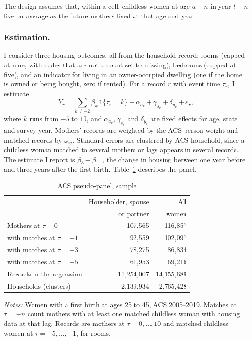 The design assumes that, within a cell, childless women at age $a-n$ in year
$t-n$ live on average as the future mothers lived at that age and year
\citep[Assumption 3]{klevenGeographyChildPenalties2025}.

\subsubsection*{Estimation.}
I consider three housing outcomes, all from the household record: rooms
(capped at nine, with codes that are not a count set to missing), bedrooms
(capped at five), and an indicator for living in an owner-occupied dwelling
(one if the home is owned or being bought, zero if rented). For a record $r$
with event time $\tau_r$, I estimate
\begin{equation}
Y_r = \sum_{k \neq -2} \beta_k \, \mathbf{1}\{\tau_r = k\} + \alpha_{a_r} +
\gamma_{s_r} + \delta_{y_r} + \varepsilon_r ,
\end{equation}
where $k$ runs from $-5$ to $10$, and $\alpha_{a_r}$, $\gamma_{s_r}$ and
$\delta_{y_r}$ are fixed effects for age, state and survey year. Mothers'
records are weighted by the ACS person weight and matched records by
$\omega_{ij}$. Standard errors are clustered by ACS household, since a childless woman
matched to several mothers or lags appears in several records. The estimate I
report is $\beta_3 - \beta_{-1}$, the change in housing between one year
before and three years after the first birth. Table~\ref{tab:app-acs-sample} describes the panel.

\begin{table}[ht]
\centering
\caption{ACS pseudo-panel, sample}
\label{tab:app-acs-sample}
\small
\begin{tabular}{@{}lrr@{}}
\toprule
 & Householder, spouse & All \\
 & or partner & women \\
\midrule
Mothers at $\tau = 0$ & 107{,}565 & 116{,}857 \\
\quad with matches at $\tau = -1$ & 92{,}559 & 102{,}097 \\
\quad with matches at $\tau = -3$ & 78{,}275 & 86{,}834 \\
\quad with matches at $\tau = -5$ & 61{,}953 & 69{,}216 \\
Records in the regression & 11{,}254{,}007 & 14{,}155{,}689 \\
Households (clusters) & 2{,}139{,}934 & 2{,}765{,}428 \\
\bottomrule
\end{tabular}
\par\smallskip
\begin{minipage}{0.75\linewidth}
\footnotesize\textit{Notes:} Women with a first birth at ages 25 to 45, ACS
2005--2019. Matches at $\tau=-n$ count mothers with at least one matched
childless woman with housing data at that lag. Records are mothers at
$\tau = 0,\dots,10$ and matched childless women at $\tau = -5,\dots,-1$, for
rooms.
\end{minipage}
\end{table}

